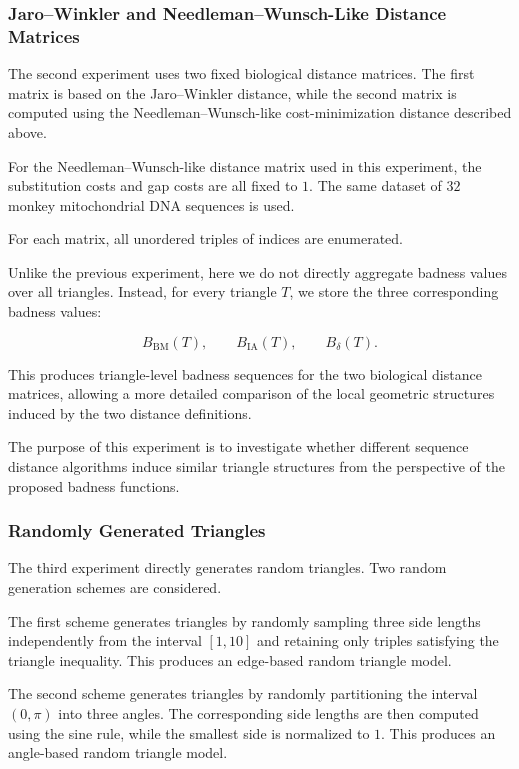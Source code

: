 \documentclass[11pt]{article}
\begin{document}
\subsubsection{Jaro--Winkler and Needleman--Wunsch-Like Distance Matrices}\label{sec:data_fixed_biological}

The second experiment uses two fixed biological distance matrices. The first matrix is based on the Jaro--Winkler distance, while the second matrix is computed using the Needleman--Wunsch-like cost-minimization distance described above.

For the Needleman--Wunsch-like distance matrix used in this experiment, the substitution costs and gap costs are all fixed to \(1\). The same dataset of \(32\) monkey mitochondrial DNA sequences is used.

For each matrix, all unordered triples of indices are enumerated.

Unlike the previous experiment, here we do not directly aggregate badness values over all triangles. Instead, for every triangle \(T\), we store the three corresponding badness values:

\[
B_{\mathrm{BM}}(T),\qquad
B_{\mathrm{IA}}(T),\qquad
B_{\delta}(T).
\]

This produces triangle-level badness sequences for the two biological distance matrices, allowing a more detailed comparison of the local geometric structures induced by the two distance definitions.

The purpose of this experiment is to investigate whether different sequence distance algorithms induce similar triangle structures from the perspective of the proposed badness functions.

\subsubsection{Randomly Generated Triangles}\label{sec:data_random_triangles}

The third experiment directly generates random triangles. Two random generation schemes are considered.

The first scheme generates triangles by randomly sampling three side lengths independently from the interval \([1,10]\) and retaining only triples satisfying the triangle inequality. This produces an edge-based random triangle model.

The second scheme generates triangles by randomly partitioning the interval \((0,\pi)\) into three angles. The corresponding side lengths are then computed using the sine rule, while the smallest side is normalized to \(1\). This produces an angle-based random triangle model.
\end{document}

